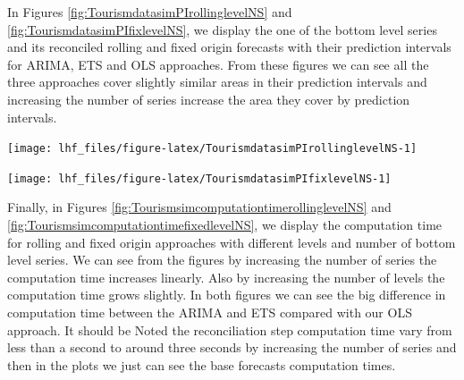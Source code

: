 \documentclass[11pt,a4paper,]{article}
\let\origfigure\figure
\let\endorigfigure\endfigure
\renewenvironment{figure}[1][2] {
    \expandafter\origfigure\expandafter[!htbp]
} {
    \endorigfigure
}
\begin{document}
In Figures \ref{fig:TourismdatasimPIrollinglevelNS} and \ref{fig:TourismdatasimPIfixlevelNS}, we display the one of the bottom level series and its reconciled rolling and fixed origin forecasts with their prediction intervals for ARIMA, ETS and OLS approaches. From these figures we can see all the three approaches cover slightly similar areas in their prediction intervals and increasing the number of series increase the area they cover by prediction intervals.

\begin{figure}

{\centering \texttt{[image: lhf\_files/figure-latex/TourismdatasimPIrollinglevelNS-1]} 

}

\caption{The actual test set for one of the bottom level series with different number of series and hierarchy levels forecasted with ETS, ARIMA and OLS with reconciliation and prediction intervals - Rolling origin - two years forecast points with 0.5 error value - Simulated tourism dataset}\label{fig:TourismdatasimPIrollinglevelNS}
\end{figure}

\begin{figure}

{\centering \texttt{[image: lhf\_files/figure-latex/TourismdatasimPIfixlevelNS-1]} 

}

\caption{The actual test set for one of the bottom level series with different number of series and hierarchy levels forecasted with ETS, ARIMA and OLS with reconciliation and prediction intervals - Fixed origin - two years forecast points with 0.5 error value - Simulated tourism dataset}\label{fig:TourismdatasimPIfixlevelNS}
\end{figure}

Finally, in Figures \ref{fig:TourismsimcomputationtimerollinglevelNS} and \ref{fig:TourismsimcomputationtimefixedlevelNS}, we display the computation time for rolling and fixed origin approaches with different levels and number of bottom level series. We can see from the figures by increasing the number of series the computation time increases linearly. Also by increasing the number of levels the computation time grows slightly. In both figures we can see the big difference in computation time between the ARIMA and ETS compared with our OLS approach. It should be Noted the reconciliation step computation time vary from less than a second to around three seconds by increasing the number of series and then in the plots we just can see the base forecasts computation times.\\
\end{document}
